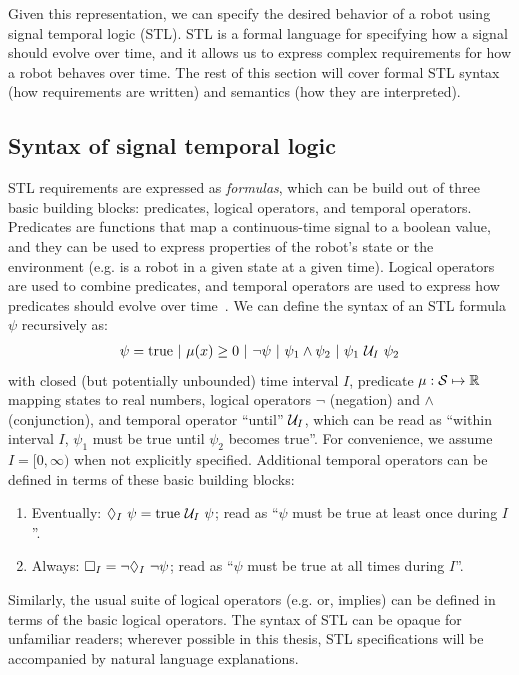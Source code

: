 Given this representation, we can specify the desired behavior of a robot using signal temporal logic (STL). STL is a formal language for specifying how a signal should evolve over time, and it allows us to express complex requirements for how a robot behaves over time. The rest of this section will cover formal STL syntax (how requirements are written) and semantics (how they are interpreted).

\subsection{Syntax of signal temporal logic}

STL requirements are expressed as \textit{formulas}, which can be build out of three basic building blocks: predicates, logical operators, and temporal operators. Predicates are functions that map a continuous-time signal to a boolean value, and they can be used to express properties of the robot's state or the environment (e.g. is a robot in a given state at a given time). Logical operators are used to combine predicates, and temporal operators are used to express how predicates should evolve over time~\cite{donzeEfficientRobustMonitoring2013a}. We can define the syntax of an STL formula $\psi$ recursively as:
\begin{align}
    \psi = \text{true}\ |\ \mu(x) \geq 0\ |\ \neg \psi\ |\ \psi_1 \wedge \psi_2\ |\ \psi_1 \ \mathcal{U}_I\ \psi_2\label{ch:iros:stl_syntax}
\end{align}
with closed (but potentially unbounded) time interval $I$, predicate $\mu: \mathcal{S} \mapsto \mathbb{R}$ mapping states to real numbers, logical operators $\neg$ (negation) and $\wedge$ (conjunction), and temporal operator ``until'' $\mathcal{U}_I$, which can be read as ``within interval $I$, $\psi_1$ must be true until $\psi_2$ becomes true''. For convenience, we assume $I = [0, \infty)$ when not explicitly specified. Additional temporal operators can be defined in terms of these basic building blocks:
\begin{enumerate}
    \item Eventually: $\lozenge_I\ \psi = \text{true } \mathcal{U}_I\ \psi$; read as ``$\psi$ must be true at least once during $I$''.
    \item Always: $\square_I = \neg \lozenge_I\ \neg \psi$; read as ``$\psi$ must be true at all times during $I$''.
\end{enumerate}
Similarly, the usual suite of logical operators (e.g. or, implies) can be defined in terms of the basic logical operators. The syntax of STL can be opaque for unfamiliar readers; wherever possible in this thesis, STL specifications will be accompanied by natural language explanations.

